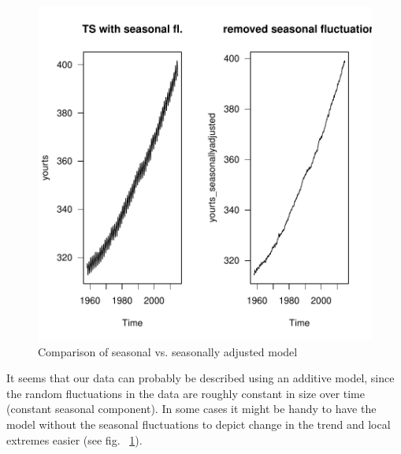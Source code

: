 \documentclass[11pt, a4paper]{article} %
\begin{document}
\begin{figure}[H]
\centering
\begin{Schunk}
\end{Schunk}
\includegraphics{alles-seasonallyadjusted}
\caption{Comparison of seasonal vs. seasonally adjusted model}
\label{decomposition2}
\end{figure}
\noindent It seems that our data can probably be described using an additive model, since the random fluctuations in the data are roughly constant in size over time (constant seasonal component). In some cases it might be handy to have the model without the seasonal fluctuations to depict change in the trend and local extremes easier (see fig. ~\ref{decomposition2}).
\end{document}
